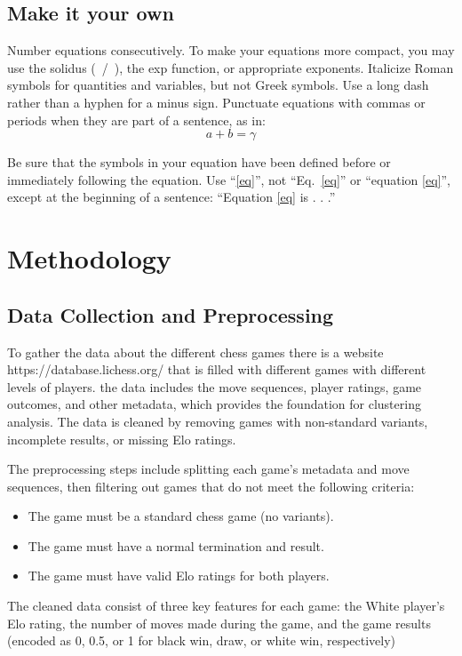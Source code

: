 \documentclass[conference]{IEEEtran}
\begin{document}
\subsection{Make it your own}
Number equations consecutively. To make your 
equations more compact, you may use the solidus (~/~), the exp function, or 
appropriate exponents. Italicize Roman symbols for quantities and variables, 
but not Greek symbols. Use a long dash rather than a hyphen for a minus 
sign. Punctuate equations with commas or periods when they are part of a 
sentence, as in:
\begin{equation}
a+b=\gamma\label{eq}
\end{equation}

Be sure that the 
symbols in your equation have been defined before or immediately following 
the equation. Use ``\eqref{eq}'', not ``Eq.~\eqref{eq}'' or ``equation \eqref{eq}'', except at 
the beginning of a sentence: ``Equation \eqref{eq} is . . .''

\section{Methodology}
\subsection{Data Collection and Preprocessing}
To gather the data about the different chess games there is a website https://database.lichess.org/ that is filled with different games with different levels of players. the data includes the move sequences, player ratings, game outcomes, and other metadata, which provides the foundation for clustering analysis. The data is cleaned by removing games with non-standard variants, incomplete results, or missing Elo ratings.

The preprocessing steps include splitting each game's metadata and move sequences, then filtering out games that do not meet the following criteria:
\begin{itemize}
    \item The game must be a standard chess game (no variants).
    \item The game must have a normal termination and result.
    \item The game must have valid Elo ratings for both players.
\end{itemize}

The cleaned data consist of three key features for each game: the White player's Elo rating, the number of moves made during the game, and the game results (encoded as 0, 0.5, or 1 for black win, draw, or white win, respectively)
\end{document}
